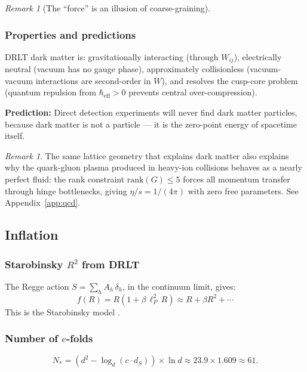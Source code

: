 \documentclass[12pt]{article}
\theoremstyle{remark}
\newtheorem{remark}[theorem]{Remark}
\theoremstyle{definition}
\begin{document}
\begin{remark}[The ``force'' is an illusion of coarse-graining]
\subsubsection{Properties and predictions}

DRLT dark matter is: gravitationally interacting (through $W_{ij}$), electrically neutral (vacuum has no gauge phase), approximately collisionless (vacuum-vacuum interactions are second-order in $W$), and resolves the cusp-core problem (quantum repulsion from $\hbar_\text{eff} > 0$ prevents central over-compression).

\textbf{Prediction:} Direct detection experiments will never find dark matter particles, because dark matter is not a particle --- it is the zero-point energy of spacetime itself.

\begin{remark}
The same lattice geometry that explains dark matter also explains why the quark-gluon plasma produced in heavy-ion collisions behaves as a nearly perfect fluid: the rank constraint $\text{rank}(G) \leq 5$ forces all momentum transfer through hinge bottlenecks, giving $\eta/s = 1/(4\pi)$ with zero free parameters. See Appendix~\ref{app:qcd}.
\end{remark}

\subsection{Inflation}

\subsubsection{Starobinsky $R^2$ from DRLT}

The Regge action $S = \sum_h A_h\,\delta_h$, in the continuum limit, gives:
\begin{equation}
f(R) = R(1 + \beta\,\ell_P^2\,R) \approx R + \beta R^2 + \cdots
\end{equation}
This is the Starobinsky model \cite{Starobinsky}.

\subsubsection{Number of $e$-folds}

\begin{equation}
N_* = (d^2 - \log_d(c \cdot d_S)) \times \ln d \approx 23.9 \times 1.609 \approx 61.
\end{equation}


\end{remark}
\end{document}
